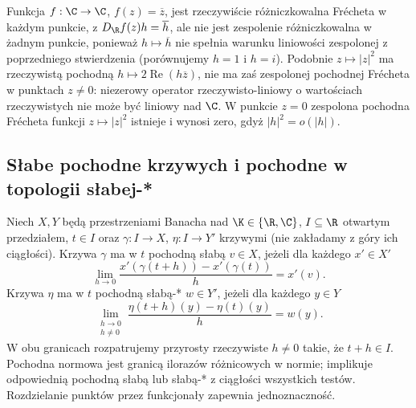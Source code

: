 \begin{przyklad}
\label{ex:complex-nonholomorphic14}
Funkcja $f:\C\to\C$, $f(z)=\overline z$, jest rzeczywiście różniczkowalna Frécheta w każdym punkcie, z $D_{\R}f(z)h=\overline h$, ale nie jest zespolenie różniczkowalna w żadnym punkcie, ponieważ $h\mapsto\overline h$ nie spełnia warunku liniowości zespolonej z poprzedniego stwierdzenia (porównujemy $h=1$ i $h=i$). Podobnie $z\mapsto|z|^2$ ma rzeczywistą pochodną $h\mapsto2\operatorname{Re}(h\overline z)$, nie ma zaś zespolonej pochodnej Frécheta w punktach $z\ne0$: niezerowy operator rzeczywisto-liniowy o wartościach rzeczywistych nie może być liniowy nad $\C$. W punkcie $z=0$ zespolona pochodna Frécheta funkcji $z\mapsto|z|^2$ istnieje i wynosi zero, gdyż $|h|^2=o(|h|)$.
\end{przyklad}


\subsection{Słabe pochodne krzywych i pochodne w topologii słabej-*}

\begin{definicja}
\label{def:weak-curve-derivative14}
Niech $X,Y$ będą przestrzeniami Banacha nad $\K\in\{\R,\C\}$,
$I\subseteq\R$ otwartym przedziałem, $t\in I$ oraz
$\gamma:I\to X$, $\eta:I\to Y'$ krzywymi (nie zakładamy
z góry ich ciągłości). Krzywa $\gamma$ ma w $t$ pochodną słabą $v\in X$,
jeżeli dla każdego $x'\in X'$
\[
 \lim_{h\to0}\frac{x'(\gamma(t+h))-x'(\gamma(t))}{h}=x'(v).
\]
Krzywa $\eta$ ma w $t$ pochodną słabą-* $w\in Y'$,
jeżeli dla każdego $y\in Y$
\[
 \lim_{\substack{h\to0\\h\ne0}}
 \frac{\eta(t+h)(y)-\eta(t)(y)}{h}=w(y).
\]
W obu granicach rozpatrujemy przyrosty rzeczywiste $h\ne0$
takie, że $t+h\in I$. Pochodna normowa jest granicą
ilorazów różnicowych w normie; implikuje odpowiednią
pochodną słabą lub słabą-* z ciągłości wszystkich testów.
Rozdzielanie punktów przez funkcjonały zapewnia jednoznaczność.
\end{definicja}

